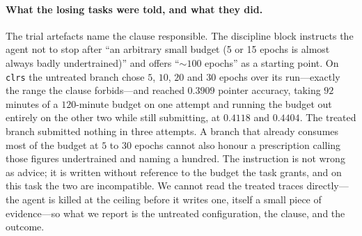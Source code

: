 \paragraph{What the losing tasks were told, and what they did.} The trial
artefacts name the clause responsible. The discipline block instructs the agent
not to stop after ``an arbitrary small budget (5 or 15 epochs is almost always
badly undertrained)'' and offers ``$\sim 100$ epochs'' as a starting point. On
\texttt{clrs} the untreated branch chose $5$, $10$, $20$ and $30$ epochs over its
run---exactly the range the clause forbids---and reached $0.3909$ pointer
accuracy, taking $92$ minutes of a $120$-minute budget on one attempt and running
the budget out entirely on the other two while still submitting, at $0.4118$ and
$0.4404$. The treated branch submitted nothing in three attempts. A branch that
already consumes most of the budget at $5$ to $30$ epochs cannot also honour a
prescription calling those figures undertrained and naming a hundred. The
instruction is not wrong as advice; it is written without reference to the budget
the task grants, and on this task the two are incompatible. We cannot read the
treated traces directly---the agent is killed at the ceiling before it writes
one, itself a small piece of evidence---so what we report is the untreated
configuration, the clause, and the outcome.
